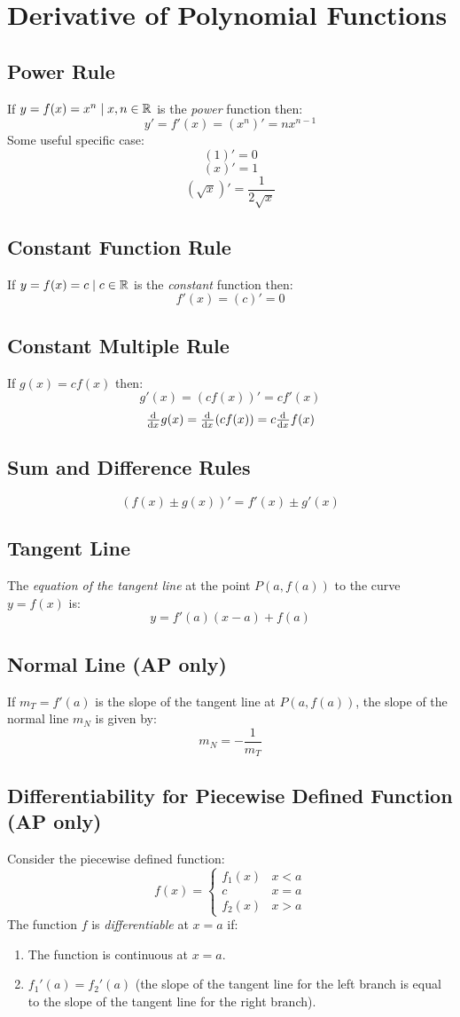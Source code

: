 \section{Derivative of Polynomial Functions}
\subsection{Power Rule}
	If $y=f(x)=x^n \mid x,n \in \mathbb{R}$ is the \emph{power} function then:
	\[y'=f'(x) = (x^n)' = nx^{n-1}\]
	Some useful specific case:
	\[(1)' = 0\]
	\[(x)' = 1\]
	\[\left(\sqrt{x}\right)' = \frac{1}{2\sqrt{x}}\]
\subsection{Constant Function Rule}
	If $y=f(x)=c \mid c \in \mathbb{R}$ is the \emph{constant} function then:
	\[f'(x) = (c)' = 0\]
\subsection{Constant Multiple Rule}
	If $g(x) = cf(x)$ then:
	\[g'(x) = \left( cf(x) \right)' = c f'(x)\]
	\[\od{}{x}g(x) = \od{}{x}(cf(x)) = c \od{}{x}f(x)\]
\subsection{Sum and Difference Rules}
	\[\left( f(x) \pm g(x) \right)' = f'(x) \pm g'(x)\]
\subsection{Tangent Line}
	The \emph{equation of the tangent line} at the point $P(a,f(a))$ to the curve $y=f(x)$ is:
	\begin{equation}\label{eq:2.2:tangentLine}
		y = f'(a)(x-a) + f(a)
	\end{equation}
\subsection{Normal Line (AP only)}
	If $m_T = f'(a)$ is the slope of the tangent line at $P(a,f(a))$, the slope of the normal line $m_N$ is given by:
	\[m_N = - \frac{1}{m_T}\]
\subsection{Differentiability for Piecewise Defined Function (AP only)}
	Consider the piecewise defined function:
	\begin{equation*}
		f(x)=
		\begin{cases}
			f_1(x) & x < a\\
			c      & x = a\\
			f_2(x) & x > a
		\end{cases}
	\end{equation*}
	The function $f$ is \emph{differentiable} at $x=a$ if:
	\begin{enumerate}
		\item The function is continuous at $x=a$.
		\item $f_1'(a) = f_2'(a)$ (the slope of the tangent line for the left branch is equal to the slope of the tangent line for the right branch).
	\end{enumerate}
